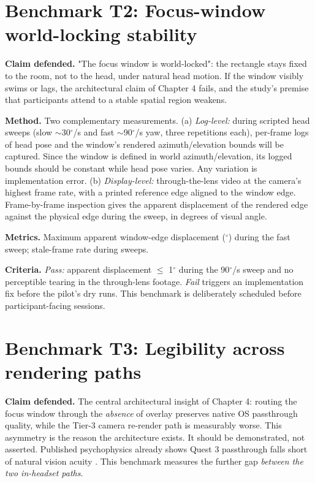 
\section{Benchmark T2: Focus-window world-locking stability}

\textbf{Claim defended.} "The focus window is world-locked": the rectangle stays fixed to the room, not
to the head, under natural head motion. If the window visibly swims or lags, the architectural
claim of Chapter 4 fails, and the study's premise that participants attend to a stable spatial
region weakens.

\textbf{Method.} Two complementary measurements. (a) \textit{Log-level:} during scripted head sweeps
(slow $\sim$30$^{\circ}$/s and fast $\sim$90$^{\circ}$/s yaw, three repetitions each), per-frame logs of head pose and the
window's rendered azimuth/elevation bounds will be captured. Since the window is defined in world
azimuth/elevation, its logged bounds should be constant while head pose varies. Any variation is
implementation error. (b) \textit{Display-level:} through-the-lens video at the camera's highest frame
rate, with a printed reference edge aligned to the window edge. Frame-by-frame inspection gives the
apparent displacement of the rendered edge against the physical edge during the sweep, in degrees
of visual angle.

\textbf{Metrics.} Maximum apparent window-edge displacement ($^{\circ}$) during the fast sweep; stale-frame rate
during sweeps.

\textbf{Criteria.} \textit{Pass:} apparent displacement $\leq$ 1$^{\circ}$ during the 90$^{\circ}$/s sweep and no perceptible tearing
in the through-lens footage. \textit{Fail} triggers an implementation fix before the pilot's dry runs.
This benchmark is deliberately scheduled before participant-facing sessions.

\section{Benchmark T3: Legibility across rendering paths}

\textbf{Claim defended.} The central architectural insight of Chapter 4: routing the focus window
through the \textit{absence} of overlay preserves native OS passthrough quality, while the Tier-3 camera
re-render path is measurably worse. This asymmetry is the reason the architecture exists. It should
be demonstrated, not asserted. Published psychophysics already shows Quest 3 passthrough falls
short of natural vision acuity \citep{wang2026}. This benchmark measures the
further gap \textit{between the two in-headset paths}.

